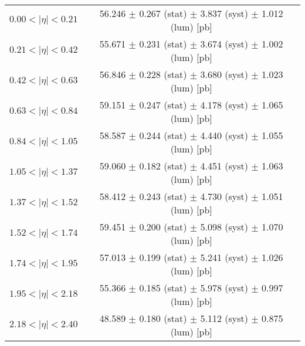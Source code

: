 \begin{tabular}{lc}
\hline
$0.00 < |\eta| <0.21$          & 56.246 $\pm$ 0.267 (stat) $\pm$ 3.837 (syst) $\pm$ 1.012 (lum) [pb]  \\
$0.21 < |\eta| <0.42$          & 55.671 $\pm$ 0.231 (stat) $\pm$ 3.674 (syst) $\pm$ 1.002 (lum) [pb]  \\
$0.42 < |\eta| <0.63$          & 56.846 $\pm$ 0.228 (stat) $\pm$ 3.680 (syst) $\pm$ 1.023 (lum) [pb]  \\
$0.63 < |\eta| <0.84$          & 59.151 $\pm$ 0.247 (stat) $\pm$ 4.178 (syst) $\pm$ 1.065 (lum) [pb]  \\
$0.84 < |\eta| <1.05$          & 58.587 $\pm$ 0.244 (stat) $\pm$ 4.440 (syst) $\pm$ 1.055 (lum) [pb]  \\
$1.05 < |\eta| <1.37$          & 59.060 $\pm$ 0.182 (stat) $\pm$ 4.451 (syst) $\pm$ 1.063 (lum) [pb]  \\
$1.37 < |\eta| <1.52$          & 58.412 $\pm$ 0.243 (stat) $\pm$ 4.730 (syst) $\pm$ 1.051 (lum) [pb]  \\
$1.52 < |\eta| <1.74$          & 59.451 $\pm$ 0.200 (stat) $\pm$ 5.098 (syst) $\pm$ 1.070 (lum) [pb]  \\
$1.74 < |\eta| <1.95$          & 57.013 $\pm$ 0.199 (stat) $\pm$ 5.241 (syst) $\pm$ 1.026 (lum) [pb]  \\
$1.95 < |\eta| <2.18$          & 55.366 $\pm$ 0.185 (stat) $\pm$ 5.978 (syst) $\pm$ 0.997 (lum) [pb]  \\
$2.18 < |\eta| <2.40$          & 48.589 $\pm$ 0.180 (stat) $\pm$ 5.112 (syst) $\pm$ 0.875 (lum) [pb]  \\
\hline
\end{tabular}
